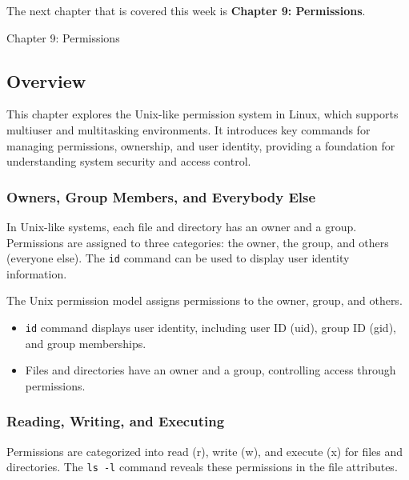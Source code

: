 The next chapter that is covered this week is \textbf{Chapter 9: Permissions}.

\begin{notes}{Chapter 9: Permissions}
    \subsection*{Overview}

    This chapter explores the Unix-like permission system in Linux, which supports multiuser and multitasking environments. It introduces key commands for managing permissions, ownership, and user 
    identity, providing a foundation for understanding system security and access control.
    
    \subsubsection*{Owners, Group Members, and Everybody Else}
    
    In Unix-like systems, each file and directory has an owner and a group. Permissions are assigned to three categories: the owner, the group, and others (everyone else). The \texttt{id} command 
    can be used to display user identity information.
    
    \begin{highlight}
    
    The Unix permission model assigns permissions to the owner, group, and others.
    
    \begin{itemize}
        \item \texttt{id} command displays user identity, including user ID (uid), group ID (gid), and group memberships.
        \item Files and directories have an owner and a group, controlling access through permissions.
    \end{itemize}
    
    \end{highlight}
    
    \subsubsection*{Reading, Writing, and Executing}
    
    Permissions are categorized into read (r), write (w), and execute (x) for files and directories. The \texttt{ls -l} command reveals these permissions in the file attributes.
    

\end{notes}
